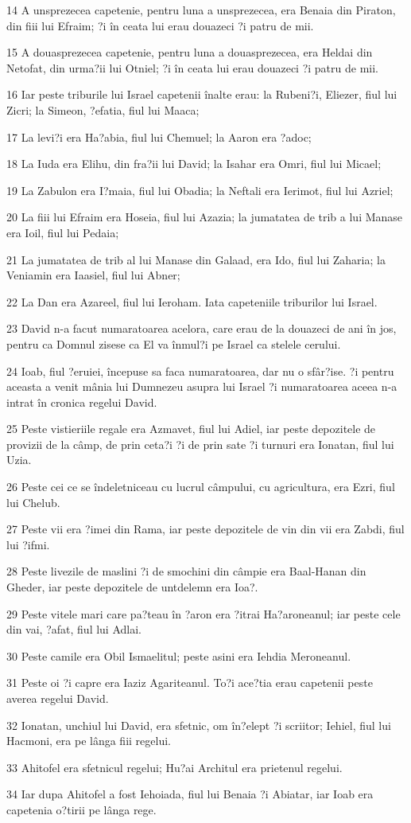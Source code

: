 \par 14 A unsprezecea capetenie, pentru luna a unsprezecea, era Benaia din Piraton, din fiii lui Efraim; ?i în ceata lui erau douazeci ?i patru de mii.
\par 15 A douasprezecea capetenie, pentru luna a douasprezecea, era Heldai din Netofat, din urma?ii lui Otniel; ?i în ceata lui erau douazeci ?i patru de mii.
\par 16 Iar peste triburile lui Israel capetenii înalte erau: la Rubeni?i, Eliezer, fiul lui Zicri; la Simeon, ?efatia, fiul lui Maaca;
\par 17 La levi?i era Ha?abia, fiul lui Chemuel; la Aaron era ?adoc;
\par 18 La Iuda era Elihu, din fra?ii lui David; la Isahar era Omri, fiul lui Micael;
\par 19 La Zabulon era I?maia, fiul lui Obadia; la Neftali era Ierimot, fiul lui Azriel;
\par 20 La fiii lui Efraim era Hoseia, fiul lui Azazia; la jumatatea de trib a lui Manase era Ioil, fiul lui Pedaia;
\par 21 La jumatatea de trib al lui Manase din Galaad, era Ido, fiul lui Zaharia; la Veniamin era Iaasiel, fiul lui Abner;
\par 22 La Dan era Azareel, fiul lui Ieroham. Iata capeteniile triburilor lui Israel.
\par 23 David n-a facut numaratoarea acelora, care erau de la douazeci de ani în jos, pentru ca Domnul zisese ca El va înmul?i pe Israel ca stelele cerului.
\par 24 Ioab, fiul ?eruiei, începuse sa faca numaratoarea, dar nu o sfâr?ise. ?i pentru aceasta a venit mânia lui Dumnezeu asupra lui Israel ?i numaratoarea aceea n-a intrat în cronica regelui David.
\par 25 Peste vistieriile regale era Azmavet, fiul lui Adiel, iar peste depozitele de provizii de la câmp, de prin ceta?i ?i de prin sate ?i turnuri era Ionatan, fiul lui Uzia.
\par 26 Peste cei ce se îndeletniceau cu lucrul câmpului, cu agricultura, era Ezri, fiul lui Chelub.
\par 27 Peste vii era ?imei din Rama, iar peste depozitele de vin din vii era Zabdi, fiul lui ?ifmi.
\par 28 Peste livezile de maslini ?i de smochini din câmpie era Baal-Hanan din Gheder, iar peste depozitele de untdelemn era Ioa?.
\par 29 Peste vitele mari care pa?teau în ?aron era ?itrai Ha?aroneanul; iar peste cele din vai, ?afat, fiul lui Adlai.
\par 30 Peste camile era Obil Ismaelitul; peste asini era Iehdia Meroneanul.
\par 31 Peste oi ?i capre era Iaziz Agariteanul. To?i ace?tia erau capetenii peste averea regelui David.
\par 32 Ionatan, unchiul lui David, era sfetnic, om în?elept ?i scriitor; Iehiel, fiul lui Hacmoni, era pe lânga fiii regelui.
\par 33 Ahitofel era sfetnicul regelui; Hu?ai Architul era prietenul regelui.
\par 34 Iar dupa Ahitofel a fost Iehoiada, fiul lui Benaia ?i Abiatar, iar Ioab era capetenia o?tirii pe lânga rege.


